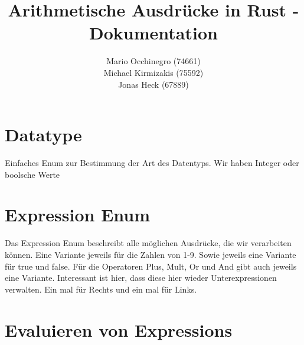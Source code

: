 \documentclass[a4paper, 1ppt]{article}
\title{Arithmetische Ausdrücke in Rust - Dokumentation}
\date{}
\author{
		Mario Occhinegro (74661)\\
		Michael Kirmizakis (75592)\\
		Jonas Heck (67889)
}
\begin{document}
\nocite{*}
\maketitle
\newpage
\clearpage
\tableofcontents
\setcounter{page}{1}
\newpage
{}
\maketitle
\section{Datatype}
Einfaches Enum zur Bestimmung der Art des Datentyps.
Wir haben Integer oder boolsche Werte
\section{Expression Enum}
Das Expression Enum beschreibt alle möglichen Ausdrücke, die wir verarbeiten können.
Eine Variante jeweils für die Zahlen von 1-9. Sowie jeweils eine Variante für true und false.
Für die Operatoren Plus, Mult, Or und And gibt auch jeweils eine Variante. Interessant ist hier, dass 
diese hier wieder Unterexpressionen verwalten. Ein mal für Rechts und ein mal für Links.
\section{Evaluieren von Expressions}
\end{document}
